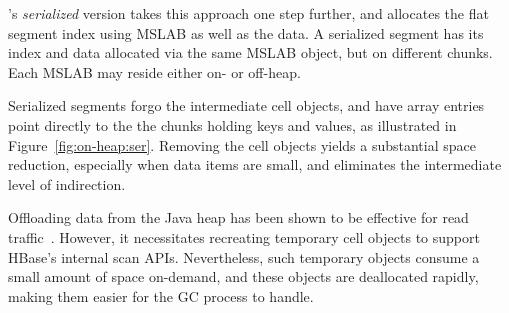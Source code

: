 \sys's \emph{serialized} version takes this approach one step further, and allocates the flat segment index
using MSLAB as well as the data. 
A serialized segment has its index and data allocated via the same MSLAB object, but on different chunks. 
Each MSLAB may reside either on- or off-heap.

Serialized segments forgo the intermediate cell
objects, and have array entries point directly to the the chunks holding keys and values, as illustrated in 
Figure~\ref{fig:on-heap:ser}.  
Removing the cell objects yields
a substantial space reduction, especially when data items are small, and eliminates the intermediate level of indirection.
 
Offloading  data from the Java heap 
has been shown to be effective for read traffic~\cite{alibabahbase}. However, it necessitates recreating temporary
cell objects to support HBase's internal scan APIs. Nevertheless, such temporary objects consume  a small amount of space on-demand, 
and these objects are  deallocated rapidly, making them easier for the GC process to handle.



